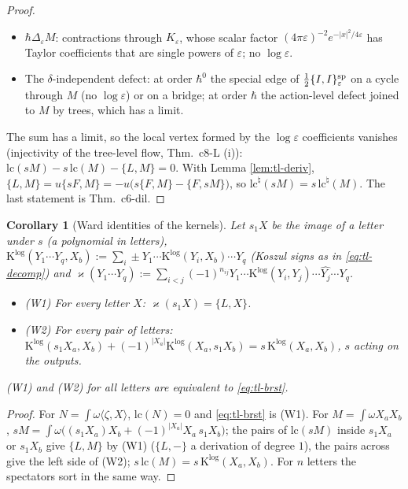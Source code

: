 \documentclass[11pt]{article}
\numberwithin{equation}{section}
\theoremstyle{plain}
\newtheorem{corollary}[theorem]{Corollary}
\theoremstyle{definition}
\begin{document}
\begin{proof}
\begin{itemize}
\item $\hbar\Delta_\varepsilon M$: contractions through $K_\varepsilon$, whose scalar factor $(4\pi\varepsilon)^{-2}e^{-|x|^2/4\varepsilon}$ has Taylor coefficients that are single powers of $\varepsilon$; no $\log\varepsilon$.
\item The $\delta$-independent defect: at order $\hbar^0$ the special edge of $\tfrac12\{I,I\}^{\rm sp}_\varepsilon$ on a cycle through $M$ (no $\log\varepsilon$) or on a bridge; at order $\hbar$ the action-level defect joined to $M$ by trees, which has a limit.
\end{itemize}
The sum has a limit, so the local vertex formed by the $\log\varepsilon$ coefficients vanishes (injectivity of the tree-level flow, Thm.~c8-L (i)): $\mathrm{lc}(sM)-s\,\mathrm{lc}(M)-\{L,M\}=0$. With Lemma \ref{lem:tl-deriv}, $\{L,M\}=u\{sF,M\}=-u\big(s\{F,M\}-\{F,sM\}\big)$, so $\mathrm{lc}^\natural(sM)=s\,\mathrm{lc}^\natural(M)$. The last statement is Thm.~c6-dil.
\end{proof}

\begin{corollary}[Ward identities of the kernels]
\label{cor:tl-ward}
Let $s_1X$ be the image of a letter under $s$ (a polynomial in letters), $\mathrm K^{\log}(Y_1\cdots Y_q,X_b):=\sum_i\pm Y_1\cdots\mathrm K^{\log}(Y_i,X_b)\cdots Y_q$ (Koszul signs as in \eqref{eq:tl-decomp}) and $\varkappa(Y_1\cdots Y_q):=\sum_{i<j}(-1)^{n_{ij}}Y_1\cdots\mathrm K^{\log}(Y_i,Y_j)\cdots\widehat{Y_j}\cdots Y_q$.
\begin{itemize}
\item (W1) For every letter $X$: $\varkappa(s_1X)=\{L,X\}$.
\item (W2) For every pair of letters: $\mathrm K^{\log}(s_1X_a,X_b)+(-1)^{|X_a|}\mathrm K^{\log}(X_a,s_1X_b)=s\,\mathrm K^{\log}(X_a,X_b)$, $s$ acting on the outputs.
\end{itemize}
(W1) and (W2) for all letters are equivalent to \eqref{eq:tl-brst}.
\end{corollary}

\begin{proof}
For $N=\int\omega\langle\zeta,X\rangle$, $\mathrm{lc}(N)=0$ and \eqref{eq:tl-brst} is (W1). For $M=\int\omega X_aX_b$, $sM=\int\omega\big((s_1X_a)X_b+(-1)^{|X_a|}X_a\,s_1X_b\big)$; the pairs of $\mathrm{lc}(sM)$ inside $s_1X_a$ or $s_1X_b$ give $\{L,M\}$ by (W1) ($\{L,-\}$ a derivation of degree $1$), the pairs across give the left side of (W2); $s\,\mathrm{lc}(M)=s\,\mathrm K^{\log}(X_a,X_b)$. For $n$ letters the spectators sort in the same way.
\end{proof}
\end{document}
